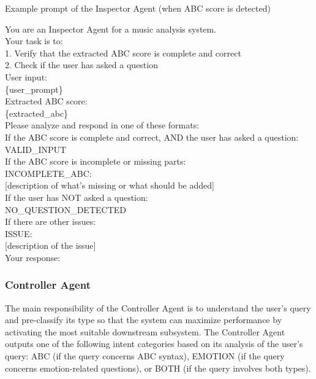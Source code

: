 \documentclass[sigconf]{acmart}
\begin{document}
\begin{promptbox}{Example prompt of the Inspector Agent (when ABC score is detected)}

You are an Inspector Agent for a music analysis system.\\

Your task is to:\\
1. Verify that the extracted ABC score is complete and correct\\
2. Check if the user has asked a question\\

User input:\\
\{user\_prompt\}\\

Extracted ABC score:\\
\{extracted\_abc\}\\

Please analyze and respond in one of these formats:\\

If the ABC score is complete and correct, AND the user has asked a question:\\
VALID\_INPUT\\

If the ABC score is incomplete or missing parts:\\
INCOMPLETE\_ABC:\\
{[description of what's missing or what should be added]}\\

If the user has NOT asked a question:\\
NO\_QUESTION\_DETECTED\\

If there are other issues:\\
ISSUE:\\
{[description of the issue]}\\

Your response:
\end{promptbox}

\subsubsection{Controller Agent}
The main responsibility of the Controller Agent is to understand the user’s query and pre-classify its type so that the system can maximize performance by activating the most suitable downstream subsystem. The Controller Agent outputs one of the following intent categories based on its analysis of the user’s query: ABC (if the query concerns ABC syntax), EMOTION (if the query concerns emotion-related questions), or BOTH (if the query involves both types).
\end{document}
